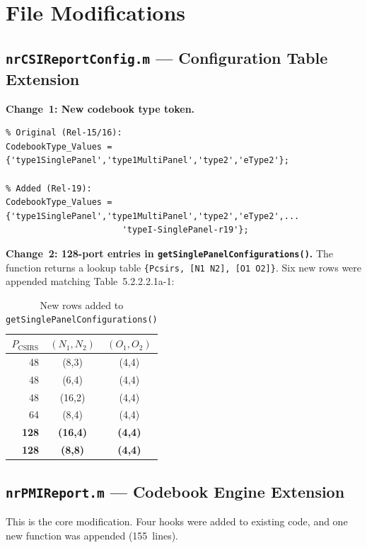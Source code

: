\documentclass[11pt,a4paper]{article}
\begin{document}
\section{File Modifications}

\subsection{\texttt{nrCSIReportConfig.m} --- Configuration Table Extension}

\textbf{Change~1: New codebook type token.}
\begin{lstlisting}
% Original (Rel-15/16):
CodebookType_Values = {'type1SinglePanel','type1MultiPanel','type2','eType2'};

% Added (Rel-19):
CodebookType_Values = {'type1SinglePanel','type1MultiPanel','type2','eType2',...
                       'typeI-SinglePanel-r19'};
\end{lstlisting}

\textbf{Change~2: 128-port entries in \texttt{getSinglePanelConfigurations()}.}
The function returns a lookup table \texttt{\{Pcsirs, [N1 N2], [O1 O2]\}}.
Six new rows were appended matching Table~5.2.2.2.1a-1:

\begin{table}[h]
\centering
\caption{New rows added to \texttt{getSinglePanelConfigurations()}}
\begin{tabular}{rcc}
\toprule
$P_\text{CSIRS}$ & $(N_1,N_2)$ & $(O_1,O_2)$ \\
\midrule
48 & (8,3) & (4,4) \\
48 & (6,4) & (4,4) \\
48 & (16,2) & (4,4) \\
64 & (8,4) & (4,4) \\
\textbf{128} & \textbf{(16,4)} & \textbf{(4,4)} \\
\textbf{128} & \textbf{(8,8)} & \textbf{(4,4)} \\
\bottomrule
\end{tabular}
\end{table}

\subsection{\texttt{nrPMIReport.m} --- Codebook Engine Extension}

This is the core modification. Four hooks were added to existing code, and
one new function was appended (155~lines).
\end{document}

